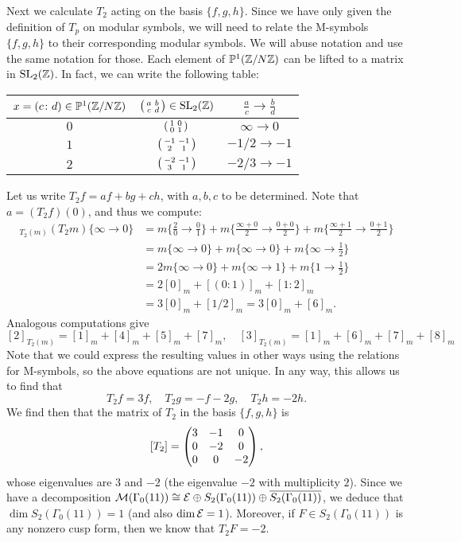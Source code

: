 Next we calculate $T_2$ acting on the basis $\{f,g,h\}$. Since we have only given the definition of $T_p$ on modular symbols, we will need to relate the M-symbols $\{f,g,h\}$ to their corresponding modular symbols. We will abuse notation and use the same notation for those. Each element of $\mathbb{P}^1(\mathbb{Z}/N\mathbb{Z})$ can be lifted to a matrix in $\operatorname{SL}_2(\mathbb{Z})$. In fact, we can write the following table:
\begin{table}[h!]
\begin{centering}
\begin{tabular}{ccc}
\toprule
$x=(c\colon d)\in\mathbb{P}^1(\mathbb{Z}/N\mathbb{Z})$&$\left(\begin{smallmatrix}a&b\\c&d\end{smallmatrix}\right)\in\operatorname{SL}_2(\mathbb{Z})$&$\frac{a}{c}\to\frac{b}{d}$\\
\midrule
$0$&$\left(\begin{smallmatrix}1&0\\0&1\end{smallmatrix}\right)$&$\infty \to 0$\\
$1$&$\left(\begin{smallmatrix}-1&-1\\2&1\end{smallmatrix}\right)$&$-1/2\to -1$\\
$2$&$\left(\begin{smallmatrix}-2&-1\\3&1\end{smallmatrix}\right)$&$-2/3\to -1$\\
\bottomrule
\end{tabular}
\end{centering}
\end{table}

Let us write $T_2 f = af+bg+ch$, with $a,b,c$ to be determined. Note that $a=(T_2f)(0)$, and thus we compute:
\begin{align*}
[0]_{T_2(m)}  (T_2m)\{\infty \to 0\} &= m\{\frac 20\to \frac 01\}+m\{\frac{\infty + 0}{2}\to \frac{0+0}{2}\}+m\{\frac{\infty+1}{2}\to \frac{0+1}{2}\}\\
&=m\{\infty\to 0\} + m\{\infty \to 0\} + m\{\infty \to \frac 12\}\\
&=2m\{\infty\to 0\} + m\{\infty\to 1\}+m\{1\to\frac 12\}\\
&=2[0]_m + [(0\colon 1)]_m + [1\colon 2]_m\\
&=3[0]_m + [1/2]_m = 3[0]_m + [6]_m.
\end{align*}
Analogous computations give
\[
[2]_{T_2(m)} = [1]_m+[4]_m+[5]_m+[7]_m,\quad [3]_{T_2(m)} = [1]_m+[6]_m+[7]_m+[8]_m
\]
Note that we could express the resulting values in other ways using the relations for M-symbols, so the above equations are not unique. In any way, this allows us to find that
\[
T_2f = 3f,\quad T_2g = -f-2g,\quad T_2h = -2h.
\]
We find then that the matrix of $T_2$ in the basis $\{f,g,h\}$ is
\[
[T_2] = \left(\begin{matrix}3&-1&0\\0&-2&0\\0&0&-2\end{matrix}\right),
\]
whose eigenvalues are $3$ and $-2$ (the eigenvalue $-2$ with multiplicity $2$). Since we have a decomposition $\mathcal{M}(\Gamma_0(11))\cong \mathcal{E}\oplus S_2(\Gamma_0(11))\oplus \overline{S_2(\Gamma_0(11))}$, we deduce that $\dim S_2(\Gamma_0(11))=1$ (and also $\dim\mathcal{E} = 1$). Moreover, if $F\in S_2(\Gamma_0(11))$ is any nonzero cusp form, then we know that $T_2F = -2$.

